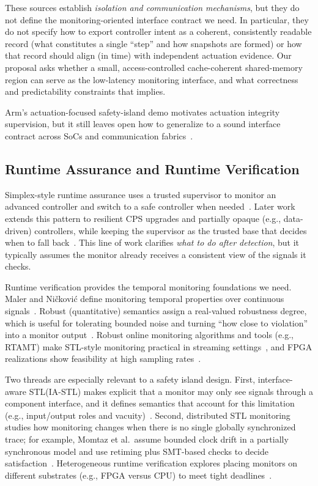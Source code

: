 \documentclass[letterpaper,twocolumn,10pt]{article}
\newcommand{\SafetyIsland}{safety island\xspace}
\newcommand{\STL}{STL\xspace}
\begin{document}
These sources establish \emph{isolation and communication mechanisms}, but they do not define the monitoring-oriented interface contract we need. In particular, they do not specify how to export controller intent as a coherent, consistently readable record (what constitutes a single ``step'' and how snapshots are formed) or how that record should align (in time) with independent actuation evidence. Our proposal asks whether a small, access-controlled cache-coherent shared-memory region can serve as the low-latency monitoring interface, and what correctness and predictability constraints that implies.

Arm's actuation-focused safety-island demo motivates actuation integrity supervision, but it still leaves open how to generalize to a sound interface contract across SoCs and communication fabrics~\cite{ArmActuationDemo}.

\subsection{Runtime Assurance and Runtime Verification}
Simplex-style runtime assurance uses a trusted supervisor to monitor an advanced controller and switch to a safe controller when needed~\cite{Sha1998SimplexACC,Sha2001UsingSimplicity}. Later work extends this pattern to resilient CPS upgrades and partially opaque (e.g., data-driven) controllers, while keeping the supervisor as the trusted base that decides when to fall back~\cite{Rutledge2018RSimplex,Yalcinkaya2023Ulgen,Desai2022BlackBoxSimplex}. This line of work clarifies \emph{what to do after detection}, but it typically assumes the monitor already receives a consistent view of the signals it checks.

Runtime verification provides the temporal monitoring foundations we need. Maler and Ni{\v c}kovi{\'c} define monitoring temporal properties over continuous signals~\cite{MalerNickovic2004}. Robust (quantitative) semantics assign a real-valued robustness degree, which is useful for tolerating bounded noise and turning ``how close to violation'' into a monitor output~\cite{FainekosPappas2009}. Robust online monitoring algorithms and tools (e.g., RTAMT) make \STL-style monitoring practical in streaming settings~\cite{Deshmukh2017,RTAMT2020}, and FPGA realizations show feasibility at high sampling rates~\cite{Dokhanchi2015FPGASTL}.

Two threads are especially relevant to a \SafetyIsland design. First, interface-aware \STL (IA-\STL) makes explicit that a monitor may only see signals through a component interface, and it defines semantics that account for this limitation (e.g., input/output roles and vacuity)~\cite{Ferrere2019IASTL}. Second, distributed \STL monitoring studies how monitoring changes when there is no single globally synchronized trace; for example, Momtaz et al.\ assume bounded clock drift in a partially synchronous model and use retiming plus SMT-based checks to decide satisfaction~\cite{Momtaz2023DistSTL}. Heterogeneous runtime verification explores placing monitors on different substrates (e.g., FPGA versus CPU) to meet tight deadlines~\cite{Gautham2020HeterogeneousRV}.
\end{document}
